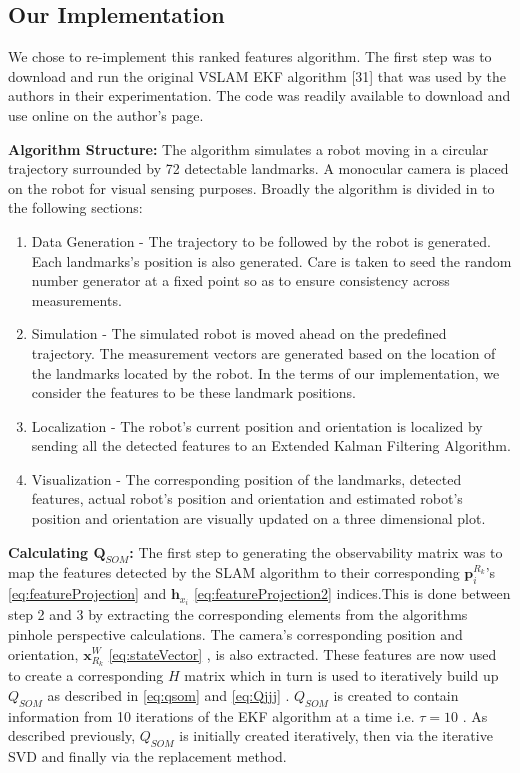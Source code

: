 \documentclass[10pt,twocolumn,letterpaper]{article}
\begin{document}
\subsection{Our Implementation}
We chose to re-implement this ranked features algorithm. The first step was to download and run the original VSLAM EKF algorithm [31] that was used by the authors in their experimentation. The code was readily available to download and use online on the author's page.

\textbf{Algorithm Structure:} The algorithm simulates a robot moving in a circular trajectory surrounded by 72 detectable landmarks. A monocular camera is placed on the robot for visual sensing purposes. Broadly the algorithm is divided in to the following sections:
\begin{enumerate}
  \item Data Generation - The trajectory to be followed by the robot is generated. Each landmarks's position is also generated. Care is taken to seed the random number generator at a fixed point so as to ensure consistency across measurements.
  \item Simulation - The simulated robot is moved ahead on the predefined trajectory. The measurement vectors are generated based on the location of the landmarks located by the robot. In the terms of our implementation, we consider the features to be these landmark positions. 
 \item Localization - The robot's current position and orientation is localized by sending all the detected features to an Extended Kalman Filtering Algorithm.
\item Visualization - The corresponding position of the landmarks, detected features, actual robot's position and orientation and estimated robot's position and orientation are visually updated on a three dimensional plot.
\end{enumerate}

\textbf{Calculating $\boldsymbol{Q}_{SOM}$:} The first step to generating the observability matrix was to map the features detected by the SLAM algorithm to their corresponding $\boldsymbol{p}_{i}^{R_k}$'s \eqref{eq:featureProjection} and $\boldsymbol{h}_{x_i}$ \eqref{eq:featureProjection2} indices.This is done between step 2 and 3 by extracting the corresponding elements from the algorithms pinhole perspective calculations. The camera's corresponding position and orientation, $\boldsymbol{x}_{R_k}^W$ \eqref{eq:stateVector} , is also extracted. These features are now used to create a corresponding $H$ matrix which in turn is used to iteratively build up $Q_{SOM}$ as described in \eqref{eq:qsom} and \eqref{eq:Qjjj} . $Q_{SOM}$ is created to contain information from 10 iterations of the EKF algorithm at a time i.e. $\tau = 10$ . As described previously, $Q_{SOM}$ is initially created iteratively, then via the iterative SVD and finally via the replacement method.
  
\end{document}
